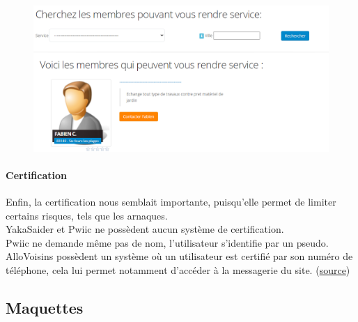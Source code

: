 \documentclass[a4paper,11pt]{article}
\begin{document}
\begin{figure}[H]
  \includegraphics[width=\linewidth]{images/erreur-yakasaider.png}
  \label{fig:erreur-yakasaider}
\end{figure}

\paragraph{Certification}

Enfin, la certification nous semblait importante, puisqu’elle permet de limiter certains risques, tels que les arnaques.\\

YakaSaider et Pwiic ne possèdent aucun système de certification.\\

Pwiic ne demande même pas de nom, l’utilisateur s’identifie par un pseudo.\\

AlloVoisins possèdent un système où un utilisateur est certifié par son numéro de téléphone,
cela lui permet notamment d’accéder à la messagerie du site. (\href{https://support.allovoisins.com/hc/fr/articles/360000816614-Pourquoi-dois-je-certifier-mon-num%C3%A9ro-de-mobile-pour-pouvoir-acc%C3%A9der-%C3%A0-la-messagerie-}{source})

\subsection{Maquettes}
\end{document}
